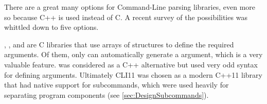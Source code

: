 There are a great many options for Command-Line parsing libraries, even more so because C++ is used instead of C.
A recent survey of the possibilities\cite{attractivechaos2018AC/C++} was whittled down to five options.

\cite{FreeSoftwareFoundationGetopt3:Page}, \cite{GNUProjectArgpLibrary}, and \cite{VajzovicGoptLibrary} are C libraries that use arrays of structures to define the required arguments.
Of them, only  can automatically generate a  argument, which is a very valuable feature.
\cite{jarro2783Cxxopts:Parser} was considered as a C++ alternative but used very odd syntax for defining arguments.
Ultimately CLI11\cite{CLIUtilsCLI11} was chosen as a modern C++11 library that had native support for subcommands, which were used heavily for separating program components (see \cref{sec:DesignSubcommands}).